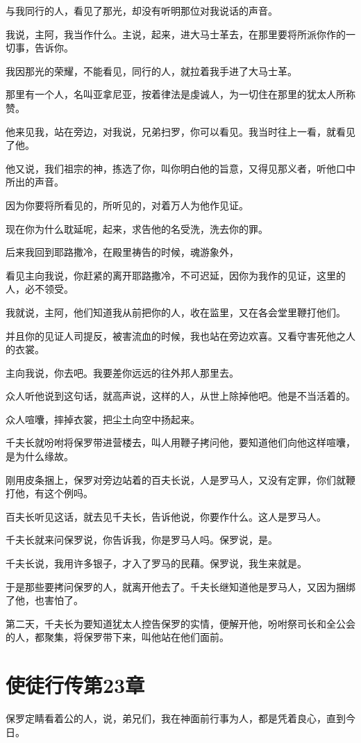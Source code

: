 \documentclass[12pt,oneside]{book}
\begin{document}
与我同行的人，看见了那光，却没有听明那位对我说话的声音。

我说，主阿，我当作什么。主说，起来，进大马士革去，在那里要将所派你作的一切事，告诉你。

我因那光的荣耀，不能看见，同行的人，就拉着我手进了大马士革。

那里有一个人，名叫亚拿尼亚，按着律法是虔诚人，为一切住在那里的犹太人所称赞。

他来见我，站在旁边，对我说，兄弟扫罗，你可以看见。我当时往上一看，就看见了他。

他又说，我们祖宗的神，拣选了你，叫你明白他的旨意，又得见那义者，听他口中所出的声音。

因为你要将所看见的，所听见的，对着万人为他作见证。

现在你为什么耽延呢，起来，求告他的名受洗，洗去你的罪。

后来我回到耶路撒冷，在殿里祷告的时候，魂游象外，

看见主向我说，你赶紧的离开耶路撒冷，不可迟延，因你为我作的见证，这里的人，必不领受。

我就说，主阿，他们知道我从前把你的人，收在监里，又在各会堂里鞭打他们。

并且你的见证人司提反，被害流血的时候，我也站在旁边欢喜。又看守害死他之人的衣裳。

主向我说，你去吧。我要差你远远的往外邦人那里去。

众人听他说到这句话，就高声说，这样的人，从世上除掉他吧。他是不当活着的。

众人喧囔，摔掉衣裳，把尘土向空中扬起来。

千夫长就吩咐将保罗带进营楼去，叫人用鞭子拷问他，要知道他们向他这样喧囔，是为什么缘故。

刚用皮条捆上，保罗对旁边站着的百夫长说，人是罗马人，又没有定罪，你们就鞭打他，有这个例吗。

百夫长听见这话，就去见千夫长，告诉他说，你要作什么。这人是罗马人。

千夫长就来问保罗说，你告诉我，你是罗马人吗。保罗说，是。

千夫长说，我用许多银子，才入了罗马的民藉。保罗说，我生来就是。

于是那些要拷问保罗的人，就离开他去了。千夫长继知道他是罗马人，又因为捆绑了他，也害怕了。

第二天，千夫长为要知道犹太人控告保罗的实情，便解开他，吩咐祭司长和全公会的人，都聚集，将保罗带下来，叫他站在他们面前。

\chapter{使徒行传第23章}
保罗定睛看着公的人，说，弟兄们，我在神面前行事为人，都是凭着良心，直到今日。
\end{document}
